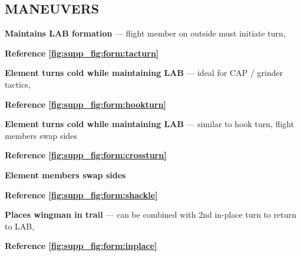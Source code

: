 \subsection{MANEUVERS}

\begin{tcoloritemize}
    \textbf{Maintains LAB formation} --- flight member on outside must initiate turn,
    
    \hfill\textbf{Reference \cref{fig:supp_fig:form:tacturn}}

    \textbf{Element turns cold while maintaining LAB} --- ideal for CAP / grinder tactics,
    
    \hfill\textbf{Reference \cref{fig:supp_fig:form:hookturn}}

    \textbf{Element turns cold while maintaining LAB} --- similar to hook turn, flight members swap sides
    
    \hfill\textbf{Reference \cref{fig:supp_fig:form:crossturn}}

    \blueitem[Shackle]
    \textbf{Element members swap sides}
    
    \hfill\textbf{Reference \cref{fig:supp_fig:form:shackle}}

    \textbf{Places wingman in trail} --- can be combined with 2nd in-place turn to return to LAB,

    \hfill\textbf{Reference \cref{fig:supp_fig:form:inplace}}
\end{tcoloritemize}


